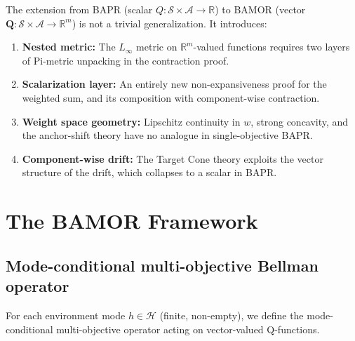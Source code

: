 \begin{remark}
\label{rem:bapr_to_bamor}
The extension from BAPR (scalar $Q : \mathcal{S} \times \mathcal{A} \to \mathbb{R}$) to BAMOR (vector $\mathbf{Q} : \mathcal{S} \times \mathcal{A} \to \mathbb{R}^m$) is not a trivial generalization.  It introduces:
\begin{enumerate}
    \item \textbf{Nested metric:} The $L_\infty$ metric on $\mathbb{R}^m$-valued functions requires two layers of Pi-metric unpacking in the contraction proof.
    \item \textbf{Scalarization layer:} An entirely new non-expansiveness proof for the weighted sum, and its composition with component-wise contraction.
    \item \textbf{Weight space geometry:} Lipschitz continuity in $w$, strong concavity, and the anchor-shift theory have no analogue in single-objective BAPR.
    \item \textbf{Component-wise drift:} The Target Cone theory exploits the vector structure of the drift, which collapses to a scalar in BAPR.
\end{enumerate}
\end{remark}


\section{The BAMOR Framework}
\label{sec:framework}

\subsection{Mode-conditional multi-objective Bellman operator}

For each environment mode $h \in \mathcal{H}$ (finite, non-empty), we define the mode-conditional multi-objective operator acting on vector-valued Q-functions.

